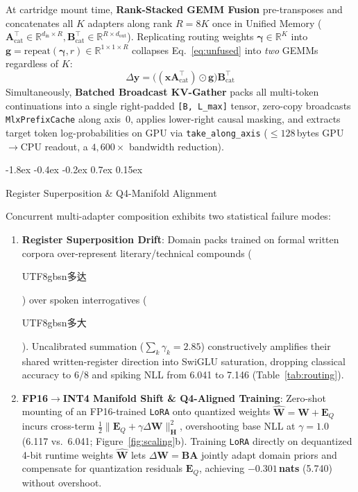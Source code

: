\documentclass[10pt,twocolumn,letterpaper]{article}
\makeatletter
\newcommand{\zh}[1]{\begin{CJK*}{UTF8}{gbsn}{\small #1}\end{CJK*}}
\newcommand{\zh}[1]{#1}
\renewcommand\subsection{\@startsection{subsection}{2}{\z@}%
  {-1.8ex \@plus -0.4ex \@minus -0.2ex}%
  {0.7ex \@plus 0.15ex}%
  {\normalfont\normalsize\fontsize{10.8}{13}\selectfont\bfseries\raggedright}}
\makeatother
\begin{document}
At cartridge mount time, \textbf{Rank-Stacked GEMM Fusion} pre-transposes and concatenates all $K$ adapters along rank $R = 8K$ once in Unified Memory ($\bm{A}_{\text{cat}}^\top \in \mathbb{R}^{d_{\text{in}} \times R}, \bm{B}_{\text{cat}}^\top \in \mathbb{R}^{R \times d_{\text{out}}}$). Replicating routing weights $\bm{\gamma} \in \mathbb{R}^K$ into $\bm{g} = \text{repeat}(\bm{\gamma}, r) \in \mathbb{R}^{1 \times 1 \times R}$ collapses Eq.~\eqref{eq:unfused} into \emph{two} GEMMs regardless of $K$:
\begin{equation}\label{eq:fused}
  \Delta \bm{y} = \big((\bm{x} \bm{A}_{\text{cat}}^\top) \odot \bm{g}\big) \bm{B}_{\text{cat}}^\top
\end{equation}
Simultaneously, \textbf{Batched Broadcast KV-Gather} packs all multi-token continuations into a single right-padded \texttt{[B, L\_max]} tensor, zero-copy broadcasts \texttt{MlxPrefixCache} along axis~0, applies lower-right causal masking, and extracts target token log-probabilities on GPU via \texttt{take\_along\_axis} ($\le 128$\,bytes GPU$\to$CPU readout, a $4{,}600\times$ bandwidth reduction).

\subsection{Register Superposition \& Q4-Manifold Alignment}

Concurrent multi-adapter composition exhibits two statistical failure modes:
\begin{enumerate}
  \item \textbf{Register Superposition Drift}: Domain packs trained on formal written corpora over-represent literary/technical compounds (\zh{多达}) over spoken interrogatives (\zh{多大}). Uncalibrated summation ($\sum_k \gamma_k = 2.85$) constructively amplifies their shared written-register direction into SwiGLU saturation, dropping classical accuracy to 6/8 and spiking NLL from 6.041 to 7.146 (Table~\ref{tab:routing}).
  \item \textbf{FP16$\to$INT4 Manifold Shift \& Q4-Aligned Training}: Zero-shot mounting of an FP16-trained \texttt{LoRA} onto quantized weights $\widehat{\bm{W}} = \bm{W} + \bm{E}_Q$ incurs cross-term $\frac{1}{2} \|\bm{E}_Q + \gamma \Delta \bm{W}\|_{\bm{H}}^2$, overshooting base NLL at $\gamma = 1.0$ (6.117 vs.\ 6.041; Figure~\ref{fig:scaling}b). Training \texttt{LoRA} directly on dequantized 4-bit runtime weights $\widehat{\bm{W}}$ lets $\Delta \bm{W} = \bm{B}\bm{A}$ jointly adapt domain priors and compensate for quantization residuals $\bm{E}_Q$, achieving \textbf{$-0.301$\,nats} (5.740) without overshoot.
\end{enumerate}
\end{document}
